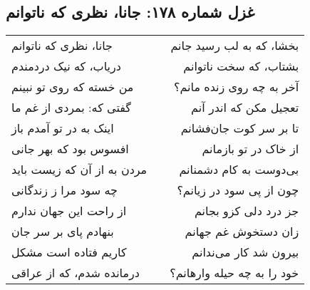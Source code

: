 \begin{center}
\section*{غزل شماره ۱۷۸: جانا، نظری که ناتوانم}
\label{sec:178}
\begin{longtable}{l p{0.5cm} r}
جانا، نظری که ناتوانم
&&
بخشا، که به لب رسید جانم
\\
دریاب، که نیک دردمندم
&&
بشتاب، که سخت ناتوانم
\\
من خسته که روی تو نبینم
&&
آخر به چه روی زنده مانم؟
\\
گفتی که: بمردی از غم ما
&&
تعجیل مکن که اندر آنم
\\
اینک به در تو آمدم باز
&&
تا بر سر کوت جان‌فشانم
\\
افسوس بود که بهر جانی
&&
از خاک در تو بازمانم
\\
مردن به از آن که زیست باید
&&
بی‌دوست به کام دشمنانم
\\
چه سود مرا ز زندگانی
&&
چون از پی سود در زیانم؟
\\
از راحت این جهان ندارم
&&
جز درد دلی کزو بجانم
\\
بنهادم پای بر سر جان
&&
زان دستخوش غم جهانم
\\
کاریم فتاده است مشکل
&&
بیرون شد کار می‌ندانم
\\
درمانده شدم، که از عراقی
&&
خود را به چه حیله وارهانم؟
\\
\end{longtable}
\end{center}
